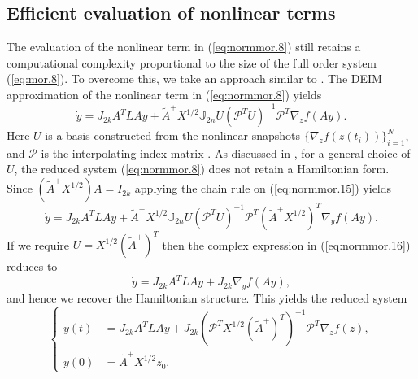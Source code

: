 \subsection{Efficient evaluation of nonlinear terms} \label{sec:normmor.3}
The evaluation of the nonlinear term in (\ref{eq:normmor.8}) still retains a computational complexity proportional to the size of the full order system (\ref{eq:mor.8}). To overcome this, we take an approach similar to . The DEIM approximation of the nonlinear term in (\ref{eq:normmor.8}) yields
\begin{equation} \label{eq:normmor.15}
	\dot y = J_{2k} A^TLAy + \tilde A ^+ X^{1/2} \mathbb J_{2n} U (\mathcal P^TU)^{-1}\mathcal  P^T \nabla_z f(Ay).
\end{equation}
Here $U$ is a basis constructed from the nonlinear snapshots $\{\nabla_z f(z(t_i))\}_{i=1}^N$, and $\mathcal P$ is the interpolating index matrix \cite{Chaturantabut:2010cz}. As discussed in , for a general choice of $U$, the reduced system (\ref{eq:normmor.8}) does not retain a Hamiltonian form. Since $(\tilde A^+ X^{1/2}) A = I_{2k}$ applying the chain rule on (\ref{eq:normmor.15}) yields
\begin{equation} \label{eq:normmor.16}
	\dot y = J_{2k} A^TLAy + \tilde A ^+ X^{1/2} \mathbb J_{2n} U (\mathcal P^TU)^{-1} \mathcal P^T (\tilde A^+ X^{1/2})^T \nabla_y f(Ay).
\end{equation}
If we require $U = X^{1/2} (\tilde A^+)^T$ then the complex expression in (\ref{eq:normmor.16}) reduces to
\begin{equation} \label{eq:normmor.17}
	\dot y = J_{2k} A^TLAy + J_{2k} \nabla_y f(Ay),
\end{equation}
and hence we recover the Hamiltonian structure. This yields the reduced system
\begin{equation} \label{eq:normmor.18}
\left\{
\begin{aligned}
	\dot y(t) &= J_{2k} A^TLAy + J_{2k} (\mathcal P^TX^{1/2} (\tilde A^+)^T)^{-1} \mathcal P^T \nabla_z f(z), \\
	y(0) &= \tilde A^+ X^{1/2} z_0.
\end{aligned}
\right.
\end{equation}
